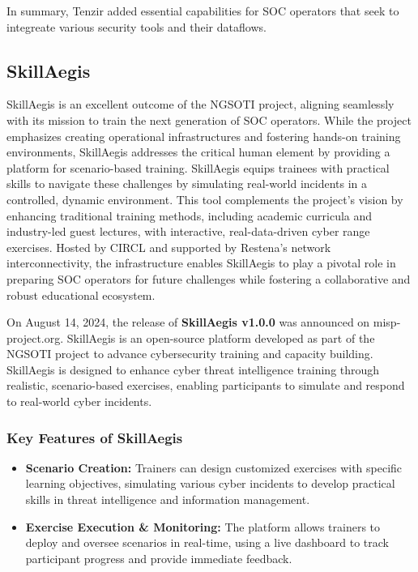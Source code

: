 In summary, Tenzir added essential capabilities for SOC operators that seek to
integreate various security tools and their dataflows.

\subsection{SkillAegis}
SkillAegis is an excellent outcome of the NGSOTI project, aligning seamlessly with its mission to train the next generation of SOC operators. While the project emphasizes creating operational infrastructures and fostering hands-on training environments, SkillAegis addresses the critical human element by providing a platform for scenario-based training.
SkillAegis equips trainees with practical skills to navigate these challenges by simulating real-world incidents in a controlled, dynamic environment.
This tool complements the project's vision by enhancing traditional training methods, including academic curricula and industry-led guest lectures, with interactive, real-data-driven cyber range exercises. Hosted by CIRCL and supported by Restena's network interconnectivity, the infrastructure enables SkillAegis to play a pivotal role in preparing SOC operators for future challenges while fostering a collaborative and robust educational ecosystem.

On August 14, 2024, the release of \textbf{SkillAegis v1.0.0} was announced on misp-project.org. SkillAegis is an open-source platform developed as part of the NGSOTI project to advance cybersecurity training and capacity building. SkillAegis is designed to enhance cyber threat intelligence training through realistic, scenario-based exercises, enabling participants to simulate and respond to real-world cyber incidents.

\subsubsection{Key Features of SkillAegis}
\begin{itemize}
	\item \textbf{Scenario Creation:} Trainers can design customized exercises with specific learning objectives, simulating various cyber incidents to develop practical skills in threat intelligence and information management.
	\item \textbf{Exercise Execution \& Monitoring:} The platform allows trainers to deploy and oversee scenarios in real-time, using a live dashboard to track participant progress and provide immediate feedback.
\end{itemize}

